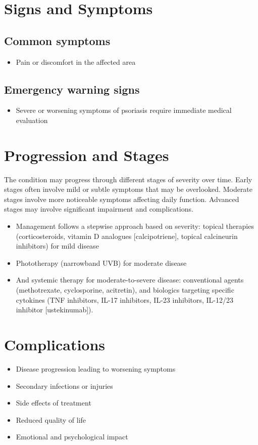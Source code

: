 \section{Signs and Symptoms}

\subsection{Common symptoms}
\begin{itemize}[noitemsep]
  \item Pain or discomfort in the affected area
  \end{itemize}

\subsection{Emergency warning signs}
\begin{itemize}[noitemsep]
  \item Severe or worsening symptoms of psoriasis require immediate medical evaluation
\end{itemize}
\section{Progression and Stages}
The condition may progress through different stages of severity over time. Early stages often involve mild or subtle symptoms that may be overlooked. Moderate stages involve more noticeable symptoms affecting daily function. Advanced stages may involve significant impairment and complications.

\begin{itemize}[noitemsep]
  \item Management follows a stepwise approach based on severity: topical therapies (corticosteroids, vitamin D analogues [calcipotriene], topical calcineurin inhibitors) for mild disease
  \item Phototherapy (narrowband UVB) for moderate disease
  \item And systemic therapy for moderate-to-severe disease: conventional agents (methotrexate, cyclosporine, acitretin), and biologics targeting specific cytokines (TNF inhibitors, IL-17 inhibitors, IL-23 inhibitors, IL-12/23 inhibitor [ustekinumab]).
\end{itemize}
\section{Complications}
\begin{itemize}[noitemsep]
  \item Disease progression leading to worsening symptoms
  \item Secondary infections or injuries
  \item Side effects of treatment
  \item Reduced quality of life
  \item Emotional and psychological impact
\end{itemize}
